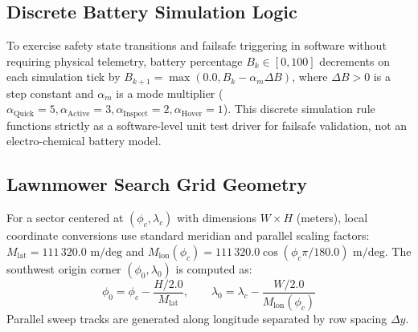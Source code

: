 \subsection{Discrete Battery Simulation Logic}
To exercise safety state transitions and failsafe triggering in software without requiring physical telemetry, battery percentage $B_k \in [0, 100]$ decrements on each simulation tick by $B_{k+1} = \max(0.0, B_k - \alpha_m \Delta B)$, where $\Delta B > 0$ is a step constant and $\alpha_m$ is a mode multiplier ($\alpha_{\text{Quick}}=5, \alpha_{\text{Active}}=3, \alpha_{\text{Inspect}}=2, \alpha_{\text{Hover}}=1$). This discrete simulation rule functions strictly as a software-level unit test driver for failsafe validation, not an electro-chemical battery model.

\subsection{Lawnmower Search Grid Geometry}
For a sector centered at $(\phi_c, \lambda_c)$ with dimensions $W \times H$ (meters), local coordinate conversions use standard meridian and parallel scaling factors: $M_{\mathrm{lat}} = 111\,320.0\text{ m/deg}$ and $M_{\mathrm{lon}}(\phi_c) = 111\,320.0 \cos(\phi_c \pi / 180.0)\text{ m/deg}$. The southwest origin corner $(\phi_0, \lambda_0)$ is computed as:
\begin{equation}
\phi_0 = \phi_c - \frac{H / 2.0}{M_{\mathrm{lat}}}, \qquad \lambda_0 = \lambda_c - \frac{W / 2.0}{M_{\mathrm{lon}}(\phi_c)}
\end{equation}
Parallel sweep tracks are generated along longitude separated by row spacing $\Delta y$.
